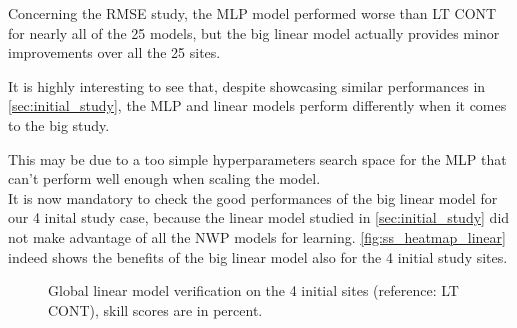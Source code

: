 Concerning the RMSE study, the MLP model performed worse than LT CONT for nearly all of the 25 models, but the big linear model actually provides minor improvements over all the 25 sites.

It is highly interesting to see that, despite showcasing similar performances in \ref{sec:initial_study}, the MLP and linear models perform differently when it comes to the big study.

This may be due to a too simple hyperparameters search space for the MLP that can't perform well enough when scaling the model.\\

It is now mandatory to check the good performances of the big linear model for our 4 inital study case, because the linear model studied in \ref{sec:initial_study} did not make advantage of all the NWP models for learning.
\autoref{fig:ss_heatmap_linear} indeed shows the benefits of the big linear model also for the 4 initial study sites.

\begin{figure}[htb!]
    \centering
    
\caption{Global linear model verification on the 4 initial sites (reference: LT CONT), skill scores are in percent.}
\label{fig:ss_heatmap_linear}
\end{figure}